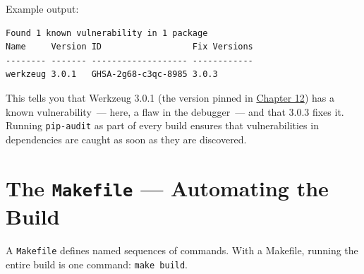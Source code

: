 \noindent{}Example output:

\begin{outputbox}[short]
\begin{Verbatim}[fontsize=\codesize, breaklines, breakanywhere, breaksymbolleft={\tiny\textcolor{muted}{$\hookrightarrow$}}]
Found 1 known vulnerability in 1 package
Name     Version ID                  Fix Versions
-------- ------- ------------------- ------------
werkzeug 3.0.1   GHSA-2g68-c3qc-8985 3.0.3
\end{Verbatim}
\end{outputbox}

\noindent{}This tells you that Werkzeug 3.0.1 (the version pinned in \hyperref[ch:12-dependency-declaration]{Chapter 12}) has a known vulnerability~--- here, a flaw in the debugger~--- and that 3.0.3 fixes it. Running \texttt{pip-audit} as part of every build ensures that vulnerabilities in dependencies are caught as soon as they are discovered.

\setcounter{section}{4}
\section{\texorpdfstring{The \texttt{Makefile} --- Automating the Build}{The Makefile --- Automating the Build}}\label{17-build-process:175-the-makefile--automating-the-build}

A \texttt{Makefile} defines named sequences of commands. With a Makefile, running the entire build is one command: \texttt{make\ build}.

